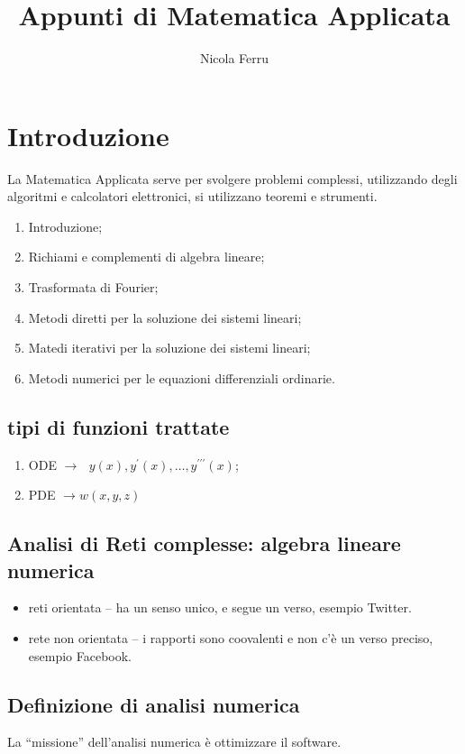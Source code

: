 \documentclass{book}
\title{Appunti di Matematica Applicata}
\author{Nicola Ferru}
\begin{document}
\maketitle
\chapter{Introduzione}
La Matematica Applicata serve per svolgere problemi complessi, utilizzando degli algoritmi e calcolatori elettronici,
si utilizzano teoremi e strumenti.
\begin{enumerate}
	\item Introduzione;
	\item Richiami e complementi di algebra lineare;
	\item Trasformata di Fourier;
	\item Metodi diretti per la soluzione dei sistemi lineari;
	\item Matedi iterativi per la soluzione dei sistemi lineari;
	\item Metodi numerici per le equazioni differenziali ordinarie.
\end{enumerate}
\section{tipi di funzioni trattate}
\begin{enumerate}
	\item ODE $\to\text{ } y(x),y^\prime(x), \dots, y^{\prime\prime\prime}(x)$;
	\item PDE $\to w (x,y,z)$
\end{enumerate}
\section{Analisi di Reti complesse: algebra lineare numerica}
\begin{itemize}
	\item reti orientata -- ha un senso unico, e segue un verso, esempio Twitter.
	\item rete non orientata -- i rapporti sono coovalenti e non c'è un verso preciso, esempio Facebook.
\end{itemize}
\section{Definizione di analisi numerica}
La ``missione'' dell'analisi numerica è ottimizzare il software.
\end{document}
